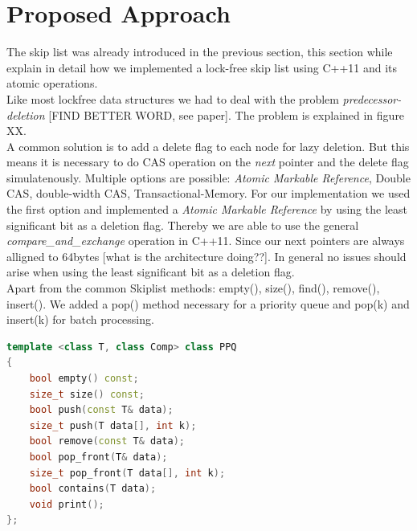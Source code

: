 \section{Proposed Approach}\label{sec:approach}
The skip list was already introduced in the previous section, this section while explain in detail how we implemented a lock-free skip list using C++11 and its atomic operations.\\
Like most lockfree data structures we had to deal with the problem {\em predecessor-deletion} [FIND BETTER WORD, see paper]. The problem is explained in figure XX.\\
A common solution is to add a delete flag to each node for lazy deletion. But this means it is necessary to do CAS operation on the {\em next} pointer and the delete flag simulatenously. Multiple options are possible: {\em Atomic Markable Reference}, Double CAS, double-width CAS, Transactional-Memory. For our implementation we used the first option and implemented a {\em Atomic Markable Reference} by using the least significant bit as a deletion flag. Thereby we are able to use the general {\em compare\_and\_exchange} operation in C++11. Since our next pointers are always alligned to 64bytes [what is the architecture doing??]. In general no issues should arise when using the least significant bit as a deletion flag.\\
Apart from the common Skiplist methods: empty(), size(), find(), remove(), insert(). We added a pop() method necessary for a priority queue and pop(k) and insert(k) for batch processing.\\


\begin{lstlisting}[language=C++,basicstyle=\tt\footnotesize,captionpos=b,caption=PPQ interface,morekeywords={*, size_t}]
template <class T, class Comp> class PPQ
{
	bool empty() const;
	size_t size() const;
	bool push(const T& data);
	size_t push(T data[], int k);
	bool remove(const T& data);
	bool pop_front(T& data);
	size_t pop_front(T data[], int k);
	bool contains(T data);
	void print();
};
\end{lstlisting}

